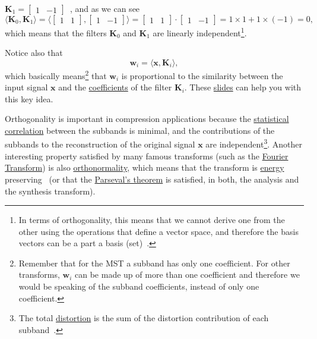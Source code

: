 ${\mathbf K}_1=\begin{bmatrix} 1 & -1\end{bmatrix}$~, and as we can
see
\begin{equation}
  \langle {\mathbf K}_0,{\mathbf K}_1 \rangle =
  \langle \begin{bmatrix}
    1 & 1
  \end{bmatrix}
  ,
  \begin{bmatrix}
    1 & -1
  \end{bmatrix}
  \rangle =
  \begin{bmatrix}
    1 & 1
  \end{bmatrix}
  \cdot
  \begin{bmatrix}
    1 & -1
  \end{bmatrix}
   = 1\times 1 + 1\times (-1) = 0,
\end{equation}
which means that the filters ${\mathbf K}_0$ and ${\mathbf K}_1$ are linearly
independent\footnote{In terms of orthogonality, this means that we
  cannot derive one from the other using the operations that define a
  vector space, and therefore the basis vectors can be a part a basis
  (set)~\cite{strang4linear}.}.

Notice also that
\begin{equation}
  {\mathbf w}_i = \langle {\mathbf x}, {\mathbf K}_i\rangle,
\end{equation}
which basically means\footnote{Remember that for the MST a subband has
  only one coefficient. For other transforms, ${\mathbf w}_i$ can be
  made up of more than one coefficient and therefore we would be
  speaking of the subband coefficients, instead of only one
  coefficient.} that ${\mathbf w}_i$ is proportional to the similarity
between the input signal ${\mathbf x}$ and the
\href{https://en.wikipedia.org/wiki/Finite_impulse_response}{coefficients} of
the filter ${\mathbf K}_i$. These
\href{https://cseweb.ucsd.edu/classes/fa17/cse166-a/lec13.pdf}{slides}
can help you with this key idea.

Orthogonality is important in compression applications because the
\href{https://en.wikipedia.org/wiki/Correlation_and_dependence}{statistical
  correlation} between the subbands is minimal, and the
contributions of the subbands to the reconstruction of the original
signal ${\mathbf x}$ are independent\footnote{The total
  \href{https://en.wikipedia.org/wiki/Distortion}{distortion} is the
  sum of the distortion contribution of each
  subband~\cite{sayood2017introduction}.}. Another interesting
property satisfied by many famous transforms (such as the
\href{https://en.wikipedia.org/wiki/Fourier_transform}{Fourier
  Transform}) is also
\href{https://en.wikipedia.org/wiki/Orthonormality}{orthonormality},
which means that the transform is
\href{https://en.wikipedia.org/wiki/Energy_(signal_processing)}{energy}
preserving~\cite{sayood2017introduction} (or that the
\href{https://en.wikipedia.org/wiki/Parseval%27s_theorem}{Parseval's
  theorem} is satisfied, in both, the analysis and the synthesis
transform).


